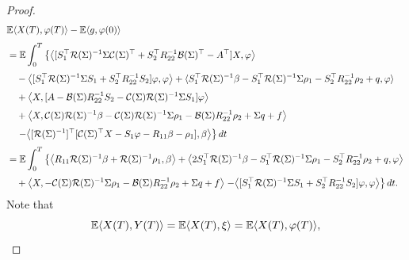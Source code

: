 \documentclass[11pt,times,twoside]{article}
\def\dbE{\mathbb{E}} \def\sE{\mathscr{E}} \def\fE{\mathfrak{E}} \def\cE{{\cal E}} \def\BE{{\bf E}} \def\Be{{\bf e}}
\def\tb{\textcolor{blue}} \def\ae{\hbox{\rm a.e.}}           \def\({\Big (}
\begin{document}
\begin{proof}
%
\begin{align*}
\ds & \dbE \lan X(T), \varphi(T)\ran -\dbE\lan g, \varphi(0)\ran \\
%
\ns\ds &= \dbE  \int_{0}^{T}\left\{\big\lan[S_{1}^{\top} \mathcal{R}(\Si)^{-1} \Si \mathcal{C}(\Si)^{\top}+S_{2}^{\top} R_{22}^{-1} \mathcal{B}(\Si)^{\top}-A^{\top}] X, \varphi\big\ran \right.\\
%
\ns\ds &\q -\big\lan [S_{1}^{\top} \mathcal{R}(\Si)^{-1} \Si S_{1}+S_{2}^{\top} R_{22}^{-1} S_{2}] \varphi, \varphi\big\ran
+\lan  S_{1}^{\top} \mathcal{R}(\Si)^{-1} \beta
-S_{1}^{\top} \mathcal{R}(\Si)^{-1} \Si\rho_1-S_{2}^{\top} R_{22}^{-1}\rho_2+q,
\varphi\ran  \\
%
\ns\ds &\q +\big\lan  X, [A-\mathcal{B}(\Si) R_{22}^{-1} S_{2}-\mathcal{C}(\Si) \mathcal{R}(\Si)^{-1} \Si S_{1} ] \varphi\big\ran \\
%
\ns\ds &\q+\big\lan  X, \mathcal{C}(\Si) \mathcal{R}(\Si)^{-1}\beta
-\cC(\Si) \mathcal{R}(\Si)^{-1}\Si\rho_1-\cB(\Si)R_{22}^{-1}\rho_2+\Si q+f\big\ran  \\
%
\ns\ds &\q \left.-\big\lan [\mathcal{R}(\Si)^{-1}]^{\top}[\mathcal{C}(\Si)^{\top} X-S_{1} \varphi-R_{11} \beta -\rho_1], \beta\big\ran \right\} d t \\
%
\ns\ds &= \dbE  \int_{0}^{T}\left\{\big\lan  R_{11} \mathcal{R}(\Si)^{-1} \beta
+\mathcal{R}(\Si)^{-1}\rho_1, \beta\big\ran
+\big\lan  2S_{1}^{\top} \mathcal{R}(\Si)^{-1} \beta
-S_{1}^{\top} \mathcal{R}(\Si)^{-1} \Si\rho_1-S_{2}^{\top} R_{22}^{-1}\rho_2+q, \varphi\big\ran \right.\\
%
\ns\ds&\q +\big\lan X,-\cC(\Si) \mathcal{R}(\Si)^{-1}\Si\rho_1-\cB(\Si)R_{22}^{-1}\rho_2+\Si q+f\big\ran
\left.-\big\lan [S_{1}^{\top} \mathcal{R}(\Si)^{-1}
\Si S_{1}+S_{2}^{\top} R_{22}^{-1} S_{2}] \varphi, \varphi\big\ran \right\} d t.
%
\end{align*}
%
Note that
%
$$ \dbE\lan  X(T), Y(T)\ran =\dbE \lan  X(T), \xi\ran =\dbE \lan  X(T), \varphi(T)\ran , $$

\end{proof}
\end{document}
